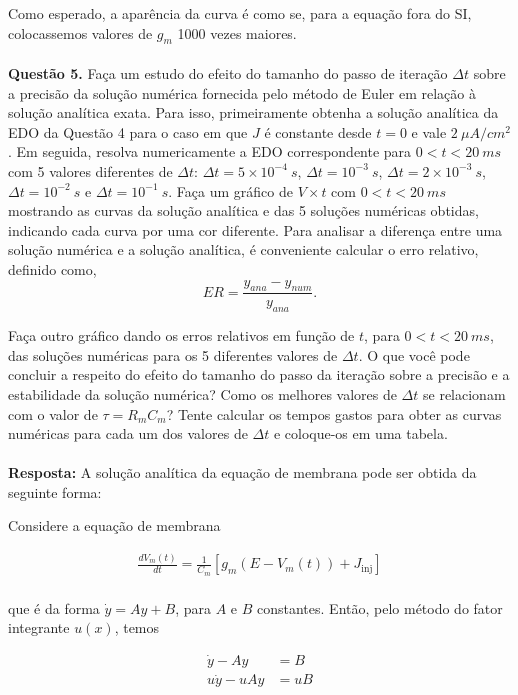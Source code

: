 \documentclass[portuguese,12pt,a4paper]{article}
\begin{document}
	Como esperado, a aparência da curva é como se, para a equação fora do SI, colocassemos valores de $g_m$ 1000 vezes maiores.\\\\
	
	\noindent\textbf{Questão 5.} Faça um estudo do efeito do tamanho do passo de iteração $\Delta t$ sobre a precisão da solução numérica fornecida pelo método de Euler em relação à solução analítica exata. Para isso, primeiramente obtenha a solução analítica da EDO da Questão 4 para o caso em que $J$ é constante desde $t=0$ e vale $2~\mu A/cm^2$. Em seguida, resolva numericamente a EDO correspondente para $0 < t < 20~ms$ com 5 valores diferentes de $\Delta t$: $\Delta t = 5 \times 10^{-4}~s$, $\Delta t = 10^{-3}~s$, $\Delta t = 2 \times 10^{-3}~s$, $\Delta t = 10^{-2}~s$ e $\Delta t = 10^{-1}~s$. Faça um gráfico de $V \times t$ com $0 < t < 20~ms$ mostrando as curvas da solução analítica e das 5 soluções numéricas obtidas, indicando cada curva por uma cor diferente. Para analisar a diferença entre uma solução numérica e a solução analítica, é conveniente calcular o erro relativo, definido como,
	\[
	ER = \frac{y_{ana} - y_{num}}{y_{ana}}.
	\]
	
	Faça outro gráfico dando os erros relativos em função de $t$, para $0 < t < 20~ms$, das soluções numéricas para os 5 diferentes valores de $\Delta t$. O que você pode concluir a respeito do efeito do tamanho do passo da iteração sobre a precisão e a estabilidade da solução numérica? Como os melhores valores de $\Delta t$ se relacionam com o valor de $\tau = R_m C_m$? Tente calcular os tempos gastos para obter as curvas numéricas para cada um dos valores de $\Delta t$ e coloque-os em uma tabela.\\\\
	
	\noindent\textbf{Resposta:} A solução analítica da equação de membrana pode ser obtida da seguinte forma:
	
	Considere a equação de membrana
	
	\begin{align*}
		\frac{dV_m(t)}{dt} = \frac{1}{C_m}\left[g_m(E - V_m(t)) + J_{\text{inj}}\right] \\
	\end{align*}
	
	que é da forma $\dot{y} = Ay + B$, para $A$ e $B$ constantes. Então, pelo método do fator integrante $u(x)$, temos
	
	\begin{align*}
		\dot{y} - Ay &= B \\
		u\dot{y} - uAy &= uB \\
	\end{align*}
	
\end{document}
